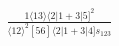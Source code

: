 \documentclass[varwidth, border=5pt]{standalone}
\begin{document}
\begin{my}
$\begin{gathered}
\scriptscriptstyle\frac{1⟨13⟩⟨2|1+3|5]^2}{⟨12⟩^2[56]⟨2|1+3|4]s_{123}}
\end{gathered}$
\end{my}
\end{document}
